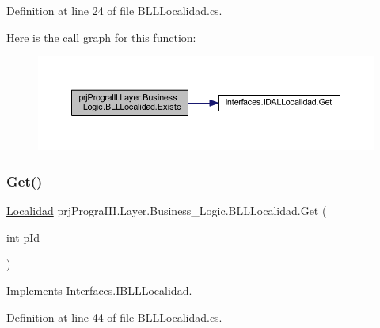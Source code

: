 Definition at line 24 of file B\+L\+L\+Localidad.\+cs.

Here is the call graph for this function\+:
\nopagebreak
\begin{figure}[H]
\begin{center}
\leavevmode
\includegraphics[width=350pt]{classprj_progra_i_i_i_1_1_layer_1_1_business___logic_1_1_b_l_l_localidad_a41a84b4c9b5c80fcbb5a1dd3e2328742_cgraph}
\end{center}
\end{figure}
\hypertarget{classprj_progra_i_i_i_1_1_layer_1_1_business___logic_1_1_b_l_l_localidad_a812546114fa49a4ca4ea9295d0d9e62b}{}\label{classprj_progra_i_i_i_1_1_layer_1_1_business___logic_1_1_b_l_l_localidad_a812546114fa49a4ca4ea9295d0d9e62b} 
\subsubsection{\texorpdfstring{Get()}{Get()}}
{\footnotesize\ttfamily \hyperlink{classprj_progra_i_i_i_1_1_layer_1_1_entities_1_1_localidad}{Localidad} prj\+Progra\+I\+I\+I.\+Layer.\+Business\+\_\+\+Logic.\+B\+L\+L\+Localidad.\+Get (\begin{DoxyParamCaption}\item[{int}]{p\+Id }\end{DoxyParamCaption})}



Implements \hyperlink{interface_interfaces_1_1_i_b_l_l_localidad_a988cb353619c30e2ec9453e8f027a8b0}{Interfaces.\+I\+B\+L\+L\+Localidad}.



Definition at line 44 of file B\+L\+L\+Localidad.\+cs.

